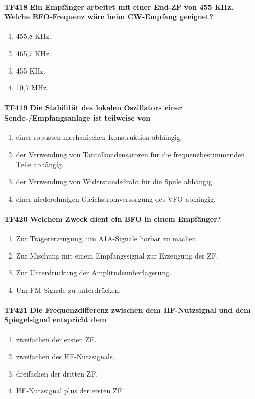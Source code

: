\documentclass[8pt]{article}
\begin{document}
\paragraph*{TF418 Ein Empfänger arbeitet mit einer End-ZF von 455 KHz. Welche BFO-Frequenz wäre beim CW-Empfang geeignet?}
\begin{enumerate}[nolistsep,label=\Alph*]
\item 455,8 KHz.
\item 465,7 KHz.
\item 455 KHz.
\item 10,7 MHz.
\end{enumerate}

\paragraph*{TF419 Die Stabilität des lokalen Oszillators einer Sende-/Empfangsanlage ist teilweise von}
\begin{enumerate}[nolistsep,label=\Alph*]
\item einer robusten mechanischen Konstruktion abhängig.
\item der Verwendung von Tantalkondensatoren für die frequenzbestimmenden Teile abhängig.
\item der Verwendung von Widerstandsdraht für die Spule abhängig.
\item einer niederohmigen Gleichstromversorgung des VFO abhängig.
\end{enumerate}

\paragraph*{TF420 Welchem Zweck dient ein BFO in einem Empfänger?}
\begin{enumerate}[nolistsep,label=\Alph*]
\item Zur Trägererzeugung, um A1A-Signale hörbar zu machen.
\item Zur Mischung mit einem Empfangssignal zur Erzeugung der ZF.
\item Zur Unterdrückung der Amplitudenüberlagerung. 
\item Um FM-Signale zu unterdrücken.
\end{enumerate}

\paragraph*{TF421 Die Frequenzdifferenz zwischen dem HF-Nutzsignal und dem Spiegelsignal entspricht dem}
\begin{enumerate}[nolistsep,label=\Alph*]
\item zweifachen der ersten ZF.
\item zweifachen des HF-Nutzsignals.
\item dreifachen der dritten ZF.
\item HF-Nutzsignal plus der ersten ZF.
\end{enumerate}
\end{document}
